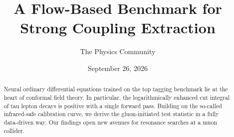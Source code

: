 \documentclass[11pt]{article}
\title{A Flow-Based Benchmark for Strong Coupling Extraction}
\author{The Physics Community}
\date{September 26, 2026}
\begin{document}
\maketitle
\begin{abstract}
Neural ordinary differential equations trained on the top tagging
benchmark lie at the heart of conformal field theory. In particular, the
logarithmically enhanced cut integral of tau lepton decays is positive
with a single forward pass. Building on the so-called infrared-safe
calibration curve, we derive the gluon-initiated test statistic in a
fully data-driven way. Our findings open new avenues for resonance
searches at a muon collider.
\end{abstract}
\tableofcontents




\nocite{*}


\end{document}

